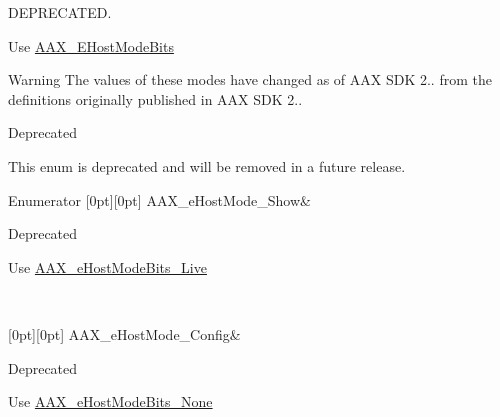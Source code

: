 D\+E\+P\+R\+E\+C\+A\+T\+ED. 

Use \mbox{\hyperlink{a00491_aa3c8056a6ce601cc3367cb7d4478e9da}{A\+A\+X\+\_\+\+E\+Host\+Mode\+Bits}}

\begin{DoxyWarning}{Warning}
The values of these modes have changed as of A\+AX S\+DK 2.. from the definitions originally published in A\+AX S\+DK 2..
\end{DoxyWarning}
\begin{DoxyRefDesc}{Deprecated}
\item[\mbox{\hyperlink{a00788__deprecated000005}{Deprecated}}]This enum is deprecated and will be removed in a future release. \end{DoxyRefDesc}
\begin{DoxyEnumFields}{Enumerator}
[0pt][0pt]{}\mbox{\label{a00491_af7d77416967955e258539694870f395aabcdafa25dc3d69fad51b53e4747eed0c}} 
A\+A\+X\+\_\+e\+Host\+Mode\+\_\+\+Show&\begin{DoxyRefDesc}{Deprecated}
\item[\mbox{\hyperlink{a00788__deprecated000009}{Deprecated}}]Use \mbox{\hyperlink{a00491_aa3c8056a6ce601cc3367cb7d4478e9daa83555a8ed532fa43f3583af95ca3d39b}{A\+A\+X\+\_\+e\+Host\+Mode\+Bits\+\_\+\+Live}} \end{DoxyRefDesc}
\\
\hline

[0pt][0pt]{}\mbox{\label{a00491_af7d77416967955e258539694870f395aa24a5c6d96b5ae069266976193f07cb6f}} 
A\+A\+X\+\_\+e\+Host\+Mode\+\_\+\+Config&\begin{DoxyRefDesc}{Deprecated}
\item[\mbox{\hyperlink{a00788__deprecated000010}{Deprecated}}]Use \mbox{\hyperlink{a00491_aa3c8056a6ce601cc3367cb7d4478e9daaa72ba643264dbc37d627b91534db7c1a}{A\+A\+X\+\_\+e\+Host\+Mode\+Bits\+\_\+\+None}} \end{DoxyRefDesc}
\\
\hline

\end{DoxyEnumFields}
\mbox{\label{a00491_a9f1ef2cb64daf30eaf145dfbb8cd0d00}} 
